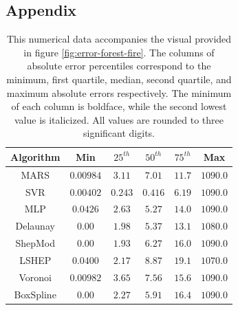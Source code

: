 \documentclass[smallextended,final]{svjour3}       %
\begin{document}
\begin{appendix}

\section*{Appendix}

\begin{table}
  \centering
  \begin{tabular}{c|c|c|c|c|c}
    \hline
    Algorithm & Min & $25^{th}$ & $50^{th}$ & $75^{th}$ & Max\\
    \hline
    MARS & $0.00984$ & $3.11$ & $7.01$ & $\mathit{11.7}$ & $1090.0$\\
    SVR & $\mathit{0.00402}$ & $\mathbf{0.243}$ & $\mathbf{0.416}$ & $\mathbf{6.19}$ & $1090.0$\\
    MLP & $0.0426$ & $2.63$ & $\mathit{5.27}$ & $14.0$ & $1090.0$\\
    Delaunay & $\mathbf{0.00}$ & $1.98$ & $5.37$ & $13.1$ & $\mathit{1080.0}$\\
    ShepMod & $\mathbf{0.00}$ & $\mathit{1.93}$ & $6.27$ & $16.0$ & $1090.0$\\
    LSHEP & $0.0400$ & $2.17$ & $8.87$ & $19.1$ & $\mathbf{1070.0}$\\
    Voronoi & $0.00982$ & $3.65$ & $7.56$ & $15.6$ & $1090.0$\\
    BoxSpline & $\mathbf{0.00}$ & $2.27$ & $5.91$ & $16.4$ & $1090.0$\\
    \hline
  \end{tabular}
  \caption{This numerical data accompanies the visual provided in
    figure \ref{fig:error-forest-fire}. The columns of absolute error
    percentiles correspond to the minimum, first quartile, median,
    second quartile, and maximum absolute errors respectively. The
    minimum of each column is boldface, while the second lowest value
    is italicized. All values are rounded to three significant
    digits.}
  \label{table:error-forest-fire}
\end{table}


\end{appendix}
\end{document}
